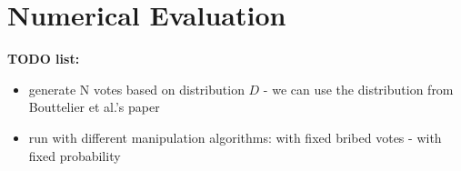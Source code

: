 
\section{Numerical Evaluation}
\label{section:num_results}

\noindent
\textbf{TODO list:}
\begin{itemize}
\item generate N votes based on distribution $D$ - we can use the distribution from Bouttelier et al.'s paper 
\item run with different manipulation algorithms: with fixed bribed votes - with fixed probability 
\end{itemize}